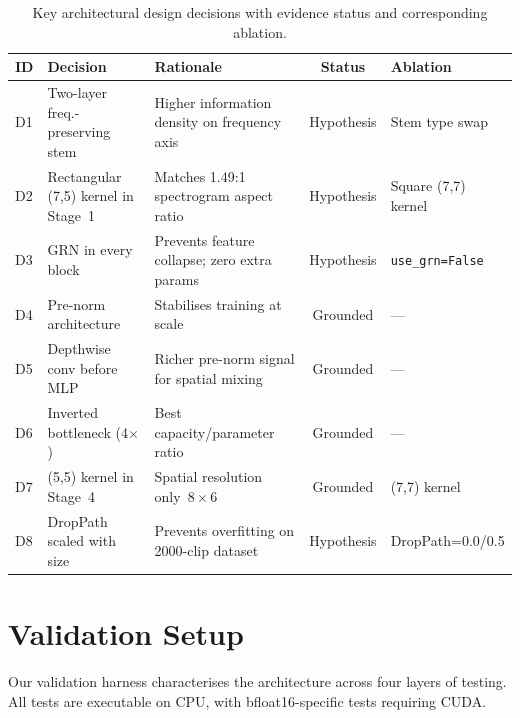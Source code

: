 \documentclass{article}
\begin{document}
\begin{table}[h]
  \centering
  \caption{Key architectural design decisions with evidence status and
  corresponding ablation.}
  \label{tab:decisions}
  \small
  \begin{tabular}{lp{5cm}p{4cm}c}
  \toprule
  \textbf{ID} & \textbf{Decision} & \textbf{Rationale} & \textbf{Status} & \textbf{Ablation} \\
  \midrule
  D1 & Two-layer freq.-preserving stem & Higher information density on frequency axis &
  Hypothesis & Stem type swap \\
  D2 & Rectangular (7,5) kernel in Stage~1 & Matches 1.49:1 spectrogram aspect ratio &
  Hypothesis & Square (7,7) kernel \\
  D3 & GRN in every block & Prevents feature collapse; zero extra params &
  Hypothesis & \texttt{use\_grn=False} \\
  D4 & Pre-norm architecture & Stabilises training at scale &
  Grounded & --- \\
  D5 & Depthwise conv before MLP & Richer pre-norm signal for spatial mixing &
  Grounded & --- \\
  D6 & Inverted bottleneck (4$\times$) & Best capacity/parameter ratio &
  Grounded & --- \\
  D7 & (5,5) kernel in Stage~4 & Spatial resolution only~$8\times6$ &
  Grounded & (7,7) kernel \\
  D8 & DropPath scaled with size & Prevents overfitting on 2000-clip dataset &
  Hypothesis & DropPath=0.0/0.5 \\
  \bottomrule
  \end{tabular}
\end{table}

\section{Validation Setup}

Our validation harness characterises the architecture across four layers of
testing. All tests are executable on CPU, with bfloat16-specific tests requiring
CUDA.
\end{document}

